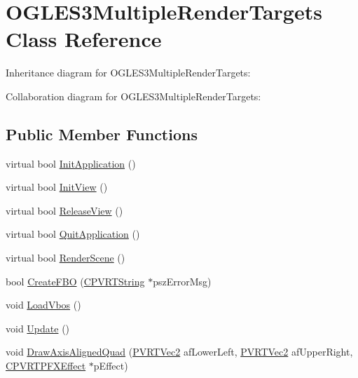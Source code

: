\hypertarget{class_o_g_l_e_s3_multiple_render_targets}{\section{O\+G\+L\+E\+S3\+Multiple\+Render\+Targets Class Reference}
\label{class_o_g_l_e_s3_multiple_render_targets}
}


Inheritance diagram for O\+G\+L\+E\+S3\+Multiple\+Render\+Targets\+:


Collaboration diagram for O\+G\+L\+E\+S3\+Multiple\+Render\+Targets\+:
\subsection*{Public Member Functions}
\begin{DoxyCompactItemize}
\item 
virtual bool \hyperlink{class_o_g_l_e_s3_multiple_render_targets_a10650f27111972864dfb90322c80fdbd}{Init\+Application} ()
\item 
virtual bool \hyperlink{class_o_g_l_e_s3_multiple_render_targets_a148e01bfca58ac1cac9a6bac5cc01a70}{Init\+View} ()
\item 
virtual bool \hyperlink{class_o_g_l_e_s3_multiple_render_targets_aefebf6080020ed85e87d2f768bf52d17}{Release\+View} ()
\item 
virtual bool \hyperlink{class_o_g_l_e_s3_multiple_render_targets_a3f69eefc92a9951e01b69db2ed1c7af6}{Quit\+Application} ()
\item 
virtual bool \hyperlink{class_o_g_l_e_s3_multiple_render_targets_aa0311b9df0df6a3d88f60b70103c4ee5}{Render\+Scene} ()
\item 
bool \hyperlink{class_o_g_l_e_s3_multiple_render_targets_a0c808914f1215e4c0f7ea625bfc73e50}{Create\+F\+B\+O} (\hyperlink{class_c_p_v_r_t_string}{C\+P\+V\+R\+T\+String} $\ast$psz\+Error\+Msg)
\item 
void \hyperlink{class_o_g_l_e_s3_multiple_render_targets_a3eb91bdf0fce1afb0793a6f15fd7a1de}{Load\+Vbos} ()
\item 
void \hyperlink{class_o_g_l_e_s3_multiple_render_targets_ad62b745b09d55c5385c912e174b886f3}{Update} ()
\item 
void \hyperlink{class_o_g_l_e_s3_multiple_render_targets_a6dd2c8435f8a51fc2ebbc731252cc367}{Draw\+Axis\+Aligned\+Quad} (\hyperlink{struct_p_v_r_t_vec2}{P\+V\+R\+T\+Vec2} af\+Lower\+Left, \hyperlink{struct_p_v_r_t_vec2}{P\+V\+R\+T\+Vec2} af\+Upper\+Right, \hyperlink{class_c_p_v_r_t_p_f_x_effect}{C\+P\+V\+R\+T\+P\+F\+X\+Effect} $\ast$p\+Effect)

\end{DoxyCompactItemize}
